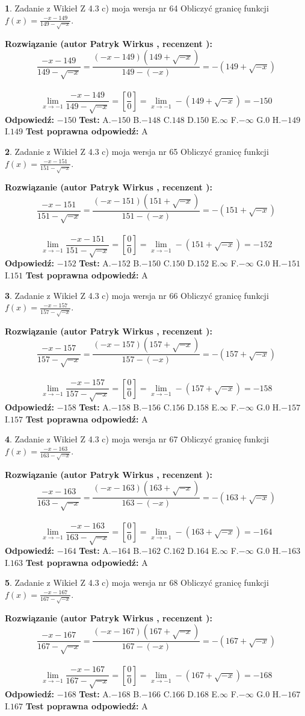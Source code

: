 \documentclass[12pt, a4paper]{article}
\theoremstyle{definition} %
\newtheorem{zad}{}
\newcommand{\zadStart}[1]{\begin{zad}#1\newline}
\newcommand{\zadStop}{\end{zad}}
\newcommand{\rozwStart}[2]{\noindent \textbf{Rozwiązanie (autor #1 , recenzent #2): }\newline}
\newcommand{\rozwStop}{\newline}
\newcommand{\odpStart}{\noindent \textbf{Odpowiedź:}\newline}
\newcommand{\odpStop}{\newline}
\newcommand{\testStart}{\noindent \textbf{Test:}\newline}
\newcommand{\testStop}{\newline}
\newcommand{\kluczStart}{\noindent \textbf{Test poprawna odpowiedź:}\newline}
\newcommand{\kluczStop}{\newline}
\begin{document}
\zadStart{Zadanie z Wikieł Z 4.3 c) moja wersja nr 64}
Obliczyć granicę funkcji $f(x)=\frac{-x-149}{149-\sqrt{-x}}$.
\zadStop
\rozwStart{Patryk Wirkus}{}
$$\frac{-x-149}{149-\sqrt{-x}}=\frac{(-x-149)(149+\sqrt{-x})}{149-(-x)}=-(149+\sqrt{-x})$$
\\
$$\lim\limits_{x\to-1}\frac{-x-149}{149-\sqrt{-x}}=[\frac{0}{0}]=\lim\limits_{x\to-1}-(149+\sqrt{-x}) =-150$$
\rozwStop
\odpStart
$-150$
\odpStop
\testStart
A.$-150$
B.$-148$
C.$148$
D.$150$
E.$\infty$
F.$-\infty$
G.$0$
H.$-149$
I.$149$
\testStop
\kluczStart
A
\kluczStop



\zadStart{Zadanie z Wikieł Z 4.3 c) moja wersja nr 65}
Obliczyć granicę funkcji $f(x)=\frac{-x-151}{151-\sqrt{-x}}$.
\zadStop
\rozwStart{Patryk Wirkus}{}
$$\frac{-x-151}{151-\sqrt{-x}}=\frac{(-x-151)(151+\sqrt{-x})}{151-(-x)}=-(151+\sqrt{-x})$$
\\
$$\lim\limits_{x\to-1}\frac{-x-151}{151-\sqrt{-x}}=[\frac{0}{0}]=\lim\limits_{x\to-1}-(151+\sqrt{-x}) =-152$$
\rozwStop
\odpStart
$-152$
\odpStop
\testStart
A.$-152$
B.$-150$
C.$150$
D.$152$
E.$\infty$
F.$-\infty$
G.$0$
H.$-151$
I.$151$
\testStop
\kluczStart
A
\kluczStop



\zadStart{Zadanie z Wikieł Z 4.3 c) moja wersja nr 66}
Obliczyć granicę funkcji $f(x)=\frac{-x-157}{157-\sqrt{-x}}$.
\zadStop
\rozwStart{Patryk Wirkus}{}
$$\frac{-x-157}{157-\sqrt{-x}}=\frac{(-x-157)(157+\sqrt{-x})}{157-(-x)}=-(157+\sqrt{-x})$$
\\
$$\lim\limits_{x\to-1}\frac{-x-157}{157-\sqrt{-x}}=[\frac{0}{0}]=\lim\limits_{x\to-1}-(157+\sqrt{-x}) =-158$$
\rozwStop
\odpStart
$-158$
\odpStop
\testStart
A.$-158$
B.$-156$
C.$156$
D.$158$
E.$\infty$
F.$-\infty$
G.$0$
H.$-157$
I.$157$
\testStop
\kluczStart
A
\kluczStop



\zadStart{Zadanie z Wikieł Z 4.3 c) moja wersja nr 67}
Obliczyć granicę funkcji $f(x)=\frac{-x-163}{163-\sqrt{-x}}$.
\zadStop
\rozwStart{Patryk Wirkus}{}
$$\frac{-x-163}{163-\sqrt{-x}}=\frac{(-x-163)(163+\sqrt{-x})}{163-(-x)}=-(163+\sqrt{-x})$$
\\
$$\lim\limits_{x\to-1}\frac{-x-163}{163-\sqrt{-x}}=[\frac{0}{0}]=\lim\limits_{x\to-1}-(163+\sqrt{-x}) =-164$$
\rozwStop
\odpStart
$-164$
\odpStop
\testStart
A.$-164$
B.$-162$
C.$162$
D.$164$
E.$\infty$
F.$-\infty$
G.$0$
H.$-163$
I.$163$
\testStop
\kluczStart
A
\kluczStop



\zadStart{Zadanie z Wikieł Z 4.3 c) moja wersja nr 68}
Obliczyć granicę funkcji $f(x)=\frac{-x-167}{167-\sqrt{-x}}$.
\zadStop
\rozwStart{Patryk Wirkus}{}
$$\frac{-x-167}{167-\sqrt{-x}}=\frac{(-x-167)(167+\sqrt{-x})}{167-(-x)}=-(167+\sqrt{-x})$$
\\
$$\lim\limits_{x\to-1}\frac{-x-167}{167-\sqrt{-x}}=[\frac{0}{0}]=\lim\limits_{x\to-1}-(167+\sqrt{-x}) =-168$$
\rozwStop
\odpStart
$-168$
\odpStop
\testStart
A.$-168$
B.$-166$
C.$166$
D.$168$
E.$\infty$
F.$-\infty$
G.$0$
H.$-167$
I.$167$
\testStop
\kluczStart
A
\kluczStop
\end{document}
